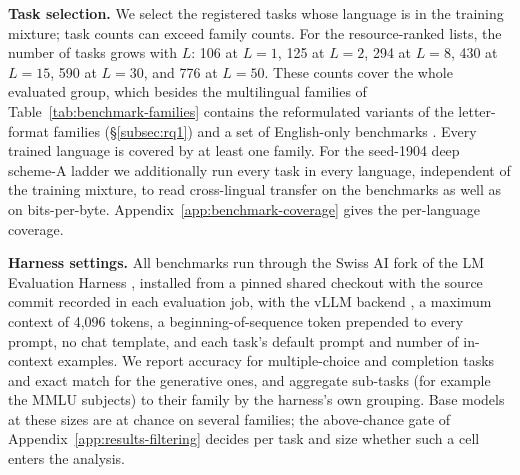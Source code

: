 \textbf{Task selection.} We select the registered tasks whose language is in the training mixture; task counts can exceed family counts. For the resource-ranked lists, the number of tasks grows with $L$: 106 at $L=1$, 125 at $L=2$, 294 at $L=8$, 430 at $L=15$, 590 at $L=30$, and 776 at $L=50$. These counts cover the whole evaluated group, which besides the multilingual families of Table~\ref{tab:benchmark-families} contains the reformulated variants of the letter-format families (\S\ref{subsec:rq1}) and a set of English-only benchmarks . Every trained language is covered by at least one family. For the seed-1904 deep scheme-A ladder we additionally run every task in every language, independent of the training mixture, to read cross-lingual transfer on the benchmarks as well as on bits-per-byte. Appendix~\ref{app:benchmark-coverage} gives the per-language coverage.

\textbf{Harness settings.} All benchmarks run through the Swiss AI fork of the LM Evaluation Harness \citep{gao_framework_2021}, installed from a pinned shared checkout with the source commit recorded in each evaluation job, with the vLLM backend \citep{kwon_efficient_2023}, a maximum context of 4,096 tokens, a beginning-of-sequence token prepended to every prompt, no chat template, and each task's default prompt and number of in-context examples. We report accuracy for multiple-choice and completion tasks and exact match for the generative ones, and aggregate sub-tasks (for example the MMLU subjects) to their family by the harness's own grouping. Base models at these sizes are at chance on several families; the above-chance gate of Appendix~\ref{app:results-filtering} decides per task and size whether such a cell enters the analysis.
